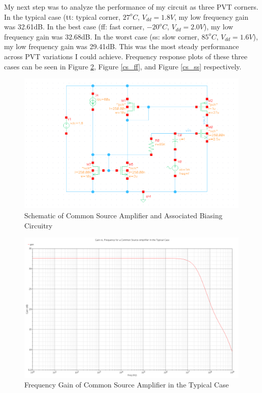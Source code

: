 \documentclass{article}
\begin{document}
My next step was to analyze the performance of my circuit as three PVT corners. In the typical case (tt: typical corner, $27^oC$, $V_{dd} = 1.8V$, my low frequency gain was 32.61dB. In the best case (ff: fast corner, $-20^oC$, $V_{dd} = 2.0V$), my low frequency gain was 32.68dB. In the worst case (ss: slow corner, $85^oC$, $V_{dd} = 1.6V$), my low frequency gain was 29.41dB. This was the most steady performance across PVT variations I could achieve. Frequency response plots of these three cases can be seen in Figure \ref{cs_tt}, Figure \ref{cs_ff}, and Figure \ref{cs_ss} respectively.

\begin{figure}[H]
\centering
\includegraphics[width=7in]{2_cs_schematic.png}
\caption{Schematic of Common Source Amplifier and Associated Biasing Circuitry}
\label{cs_schem}
\end{figure}
\newpage

\begin{figure}[H]
\centering
\includegraphics[width=5in]{2_cs_gain_tt.png}
\caption{Frequency Gain of Common Source Amplifier in the Typical Case}
\label{cs_tt}
\end{figure}
\end{document}
